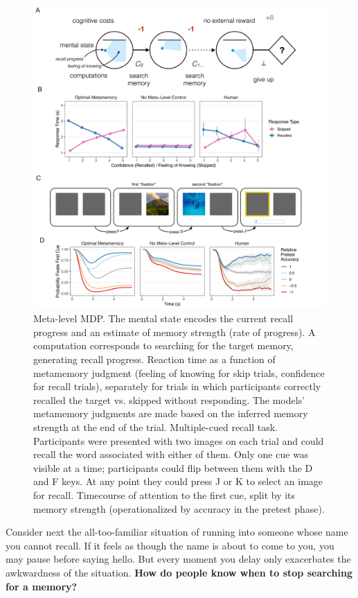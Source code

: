\documentclass[dsingle]{memo}
\begin{document}
\begin{figure}[ph]
  \centering
  \includegraphics[width=\textwidth]{diagrams/precis/memory.pdf}
  \caption{
     Meta-level MDP. The mental state encodes the current recall progress and an estimate of memory strength (rate of progress). A computation corresponds to searching for the target memory, generating recall progress.
     Reaction time as a function of metamemory judgment (feeling of knowing for skip trials, confidence for recall trials), separately for trials in which participants correctly recalled the target vs. skipped without responding. The models' metamemory judgments are made based on the inferred memory strength at the end of the trial.
     Multiple-cued recall task. Participants were presented with two images on each trial and could recall the word associated with either of them. Only one cue was visible at a time; participants could flip between them with the D and F keys. At any point they could press J or K to select an image for recall.
     Timecourse of attention to the first cue, split by its memory strength (operationalized by accuracy in the pretest phase).
  }
  \label{fig:memory}
\end{figure}


Consider next the all-too-familiar situation of running into someone whose name you cannot recall. If it feels as though the name is about to come to you, you may pause before saying hello. But every moment you delay only exacerbates the awkwardness of the situation. \textbf{How do people know when to stop searching for a memory?}
\end{document}
